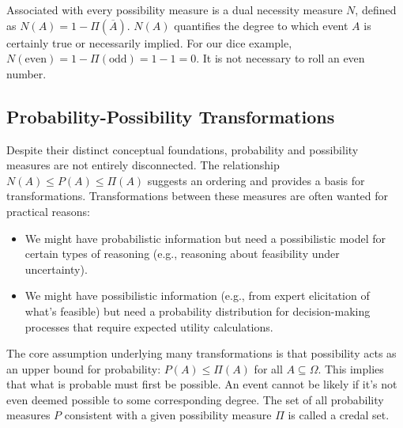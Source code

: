 Associated with every possibility measure is a dual necessity measure $N$, defined as $N(A) = 1 - \Pi(\overline{A})$. $N(A)$ quantifies the degree to which event $A$ is certainly true or necessarily implied. For our dice example, $N(\text{even}) = 1 - \Pi(\text{odd}) = 1 - 1 = 0$. It is not necessary to roll an even number.

\subsection{Probability-Possibility Transformations}
Despite their distinct conceptual foundations, probability and possibility measures are not entirely disconnected. The relationship $N(A) \le P(A) \le \Pi(A)$  suggests an ordering and provides a basis for transformations. Transformations between these measures are often wanted for practical reasons:
\begin{itemize}
    \item We might have probabilistic information but need a possibilistic model for certain types of reasoning (e.g., reasoning about feasibility under uncertainty).
    \item We might have possibilistic information (e.g., from expert elicitation of what's feasible) but need a probability distribution for decision-making processes that require expected utility calculations.
\end{itemize}
The core assumption underlying many transformations is that possibility acts as an upper bound for probability: $P(A) \le \Pi(A)$ for all $A \subseteq \Omega$. This implies that what is probable must first be possible. An event cannot be likely if it's not even deemed possible to some corresponding degree. The set of all probability measures $P$ consistent with a given possibility measure $\Pi$ is called a credal set.

